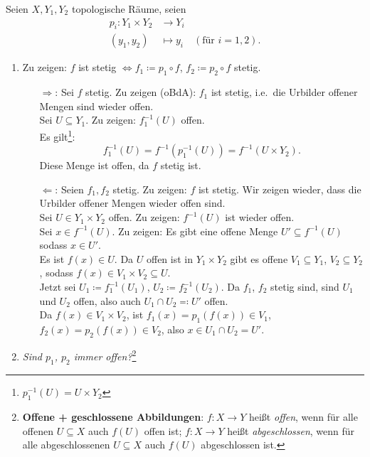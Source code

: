 \begin{solution}
  Seien \( X, Y_1, Y_2 \) topologische Räume, seien
  \begin{align*}
    p_i: Y_1 \times Y_2 &\to Y_i \\
    (y_1, y_2) &\mapsto y_i \quad (\text{für } i = 1,2)\text{.}
  \end{align*}
  \begin{enumerate}
    \item Zu zeigen: \( f \) ist stetig \( \Leftrightarrow f_1 \coloneqq p_1 \circ f \), \( f_2 \coloneqq p_2 \circ f \) stetig. \\
    \begin{itemize}
      \item[\( \Rightarrow \):] Sei \( f \) stetig. Zu zeigen (oBdA): \( f_1 \) ist stetig, i.e.\ die Urbilder offener Mengen sind wieder offen. \\
      Sei \( U \subseteq Y_1 \). Zu zeigen: \( f_1^{-1}(U) \) offen. \\
      Es gilt\footnote{\( p_1^{-1}(U) = U \times Y_2 \)}:
      \begin{equation*}
        f_1^{-1}(U) = f^{-1}(p_1^{-1}(U)) = f^{-1}(U \times Y_2)\text{.}
      \end{equation*}
      Diese Menge ist offen, da \( f \) stetig ist.
      \item[\( \Leftarrow \):] Seien \( f_1, f_2 \) stetig. Zu zeigen: \( f \) ist stetig. Wir zeigen wieder, dass die Urbilder offener Mengen wieder offen sind. \\
      Sei \( U \in Y_1 \times Y_2 \) offen. Zu zeigen: \( f^{-1}(U) \) ist wieder offen. \\
      Sei \( x \in f^{-1}(U) \). Zu zeigen: Es gibt eine offene Menge \( U' \subseteq f^{-1}(U) \) sodass \( x \in U' \). \\
      Es ist \( f(x) \in U \). Da \( U \) offen ist in \( Y_1 \times Y_2 \) gibt es offene \( V_1 \subseteq Y_1 \), \( V_2 \subseteq Y_2 \), sodass \( f( x) \in V_1 \times V_2 \subseteq U \). \\
      Jetzt sei \( U_1 \coloneqq f_1^{-1}(U_1) \), \( U_2 \coloneqq f_2^{-1}(U_2) \). Da \( f_1 \), \( f_2 \) stetig sind, sind \( U_1 \) und \( U_2 \) offen, also auch \( U_1 \cap U_2 \eqqcolon U' \) offen. \\
      Da \( f( x) \in V_1 \times V_2 \), ist \( f_1( x) = p_1(f(x)) \in V_1 \), \( f_2(x) = p_2(f(x)) \in V_2 \), also \( x \in U_1 \cap U_2 = U' \).
    \end{itemize}
    \newpage
    \item \emph{Sind \( p_1 \), \( p_2 \) immer offen?}\footnote{\textbf{Offene + geschlossene Abbildungen}: \( f: X \to Y \) heißt \emph{offen}, wenn für alle offenen \( U \subseteq X \) auch \( f(U) \) offen ist; \( f: X \to Y \) heißt \emph{abgeschlossen}, wenn für alle abgeschlossenen \( U \subseteq X \) auch \( f(U) \) abgeschlossen ist.}
    

\end{enumerate}
\end{solution}
